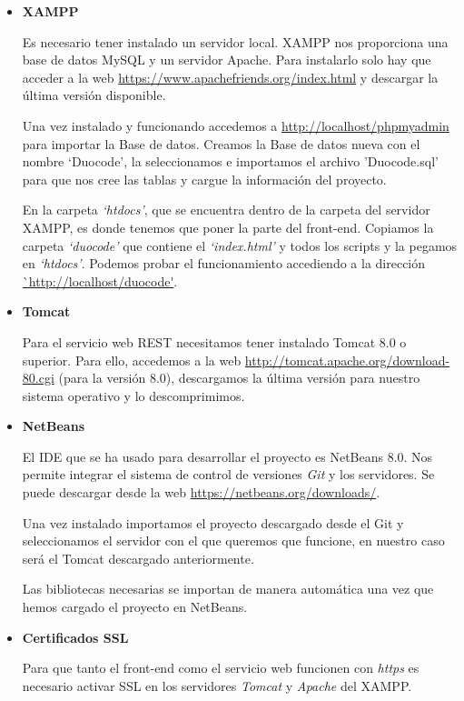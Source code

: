 \begin{itemize}
\item \textbf{XAMPP}

Es necesario tener instalado un servidor local. XAMPP nos proporciona una base de datos MySQL y un servidor Apache.
Para instalarlo solo hay que acceder a la web \url{https://www.apachefriends.org/index.html} y descargar la última versión disponible.

Una vez instalado y funcionando accedemos a \url{http://localhost/phpmyadmin} para importar la Base de datos. Creamos la Base de datos nueva con el nombre `Duocode', la seleccionamos e importamos el archivo 'Duocode.sql' para que nos cree las tablas y cargue la información del proyecto.


En la carpeta \textit{`htdocs'}, que se encuentra dentro de la carpeta del servidor XAMPP, es donde tenemos que poner la parte del front-end.
Copiamos la carpeta \textit{`duocode'} que contiene el \textit{`index.html'} y todos los scripts y la pegamos en \textit{`htdocs'}.
Podemos probar el funcionamiento accediendo a la dirección \url{`http://localhost/duocode'}.



\item \textbf{Tomcat}

Para el servicio web REST necesitamos tener instalado Tomcat 8.0 o superior. Para ello, accedemos a la web \url{http://tomcat.apache.org/download-80.cgi} (para la versión 8.0), descargamos la última versión para nuestro sistema operativo y lo descomprimimos.



\item \textbf{NetBeans}

El IDE que se ha usado para desarrollar el proyecto es NetBeans 8.0. Nos permite integrar el sistema de control de versiones \textit{Git} y los servidores. Se puede descargar desde la web \url{https://netbeans.org/downloads/}.

Una vez instalado importamos el proyecto descargado desde el Git y seleccionamos el servidor con el que queremos que funcione, en nuestro caso será el Tomcat descargado anteriormente.

Las bibliotecas necesarias se importan de manera automática una vez que hemos cargado el proyecto en NetBeans.

\item \textbf{Certificados SSL}

Para que tanto el front-end como el servicio web funcionen con \textit{https} es necesario activar SSL en los servidores \textit{Tomcat} y \textit{Apache} del XAMPP.


\end{itemize}
